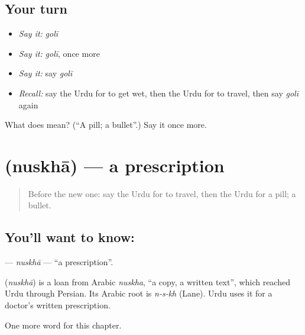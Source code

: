 \subsection*{Your turn}
\begin{itemize}
\raggedright
  \item \emph{Say it:} \emph{golī}
  \item \emph{Say it:} \emph{golī}, once more
  \item \emph{Say it:} say \emph{golī}
  \item \emph{Recall:} say the Urdu for to get wet, then the Urdu for to travel, then say \emph{golī} again
\end{itemize}

\begin{tcolorbox}[breakable,colback=teal!4,colframe=teal!35!black,title={Before you move on}]
What does  mean? (\textquotedblleft{}A pill; a bullet\textquotedblright{}.) Say it once more.
\end{tcolorbox}
\section[\texorpdfstring{\ur{نسخہ} (nuskhā)}{نسخہ (nuskhā)}]{ (nuskhā) — a prescription}

\label{lesson:UR-C185-nuskha}



\begin{quote}
Before the new one: say the Urdu for to travel, then the Urdu for a pill; a bullet.
\end{quote}

\subsection*{You'll want to know: }
\textbf{} — \emph{nuskhā} — \textquotedblleft{}a prescription\textquotedblright{}.

\begin{cousinweb}
\textbf{} (\emph{nuskhā}) is a loan from Arabic \emph{nuskha}, \textquotedblleft{}a copy, a written text\textquotedblright{}, which reached Urdu through Persian. Its Arabic root is \emph{n-s-kh} (Lane). Urdu uses it for a doctor's written prescription.
\end{cousinweb}

\begin{grammarlens}[title={What you've built}]
One more word for this chapter.
\end{grammarlens}

